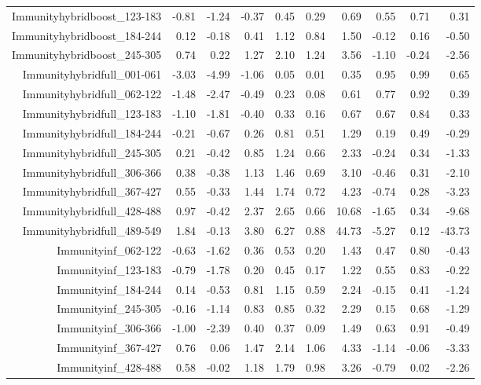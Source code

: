 \begin{table}[ht]
\begin{tabular}{rrrrrrrrrr}
  Immunityhybridboost\_123-183 & -0.81 & -1.24 & -0.37 & 0.45 & 0.29 & 0.69 & 0.55 & 0.71 & 0.31 \\ 
  Immunityhybridboost\_184-244 & 0.12 & -0.18 & 0.41 & 1.12 & 0.84 & 1.50 & -0.12 & 0.16 & -0.50 \\ 
  Immunityhybridboost\_245-305 & 0.74 & 0.22 & 1.27 & 2.10 & 1.24 & 3.56 & -1.10 & -0.24 & -2.56 \\ 
  Immunityhybridfull\_001-061 & -3.03 & -4.99 & -1.06 & 0.05 & 0.01 & 0.35 & 0.95 & 0.99 & 0.65 \\ 
  Immunityhybridfull\_062-122 & -1.48 & -2.47 & -0.49 & 0.23 & 0.08 & 0.61 & 0.77 & 0.92 & 0.39 \\ 
  Immunityhybridfull\_123-183 & -1.10 & -1.81 & -0.40 & 0.33 & 0.16 & 0.67 & 0.67 & 0.84 & 0.33 \\ 
  Immunityhybridfull\_184-244 & -0.21 & -0.67 & 0.26 & 0.81 & 0.51 & 1.29 & 0.19 & 0.49 & -0.29 \\ 
  Immunityhybridfull\_245-305 & 0.21 & -0.42 & 0.85 & 1.24 & 0.66 & 2.33 & -0.24 & 0.34 & -1.33 \\ 
  Immunityhybridfull\_306-366 & 0.38 & -0.38 & 1.13 & 1.46 & 0.69 & 3.10 & -0.46 & 0.31 & -2.10 \\ 
  Immunityhybridfull\_367-427 & 0.55 & -0.33 & 1.44 & 1.74 & 0.72 & 4.23 & -0.74 & 0.28 & -3.23 \\ 
  Immunityhybridfull\_428-488 & 0.97 & -0.42 & 2.37 & 2.65 & 0.66 & 10.68 & -1.65 & 0.34 & -9.68 \\ 
  Immunityhybridfull\_489-549 & 1.84 & -0.13 & 3.80 & 6.27 & 0.88 & 44.73 & -5.27 & 0.12 & -43.73 \\ 
  Immunityinf\_062-122 & -0.63 & -1.62 & 0.36 & 0.53 & 0.20 & 1.43 & 0.47 & 0.80 & -0.43 \\ 
  Immunityinf\_123-183 & -0.79 & -1.78 & 0.20 & 0.45 & 0.17 & 1.22 & 0.55 & 0.83 & -0.22 \\ 
  Immunityinf\_184-244 & 0.14 & -0.53 & 0.81 & 1.15 & 0.59 & 2.24 & -0.15 & 0.41 & -1.24 \\ 
  Immunityinf\_245-305 & -0.16 & -1.14 & 0.83 & 0.85 & 0.32 & 2.29 & 0.15 & 0.68 & -1.29 \\ 
  Immunityinf\_306-366 & -1.00 & -2.39 & 0.40 & 0.37 & 0.09 & 1.49 & 0.63 & 0.91 & -0.49 \\ 
  Immunityinf\_367-427 & 0.76 & 0.06 & 1.47 & 2.14 & 1.06 & 4.33 & -1.14 & -0.06 & -3.33 \\ 
  Immunityinf\_428-488 & 0.58 & -0.02 & 1.18 & 1.79 & 0.98 & 3.26 & -0.79 & 0.02 & -2.26 \\ 

\end{tabular}
\end{table}

